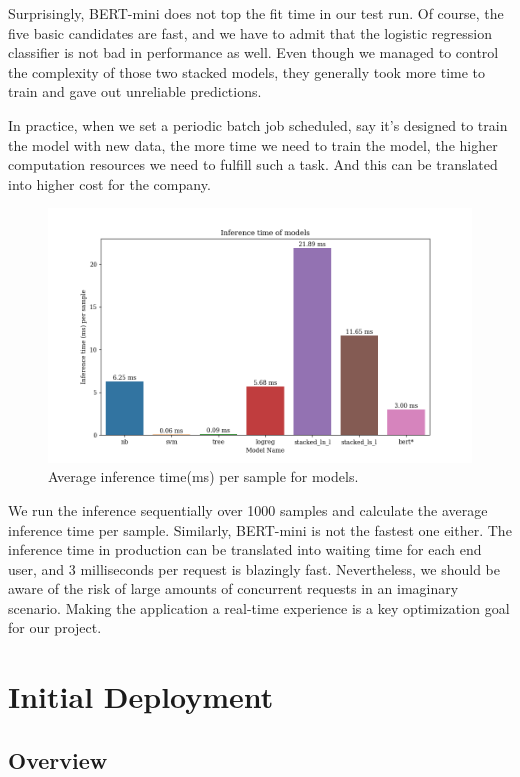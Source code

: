 \documentclass[
	a4paper,
	fontsize=10pt, %
	twoside=false, %
	secnumdepth=2, %
]{kaohandt}
\begin{document}
Surprisingly, BERT-mini does not top the fit time in our test run. Of course, the five basic candidates are fast, and we have to admit that the logistic regression classifier is not bad in performance as well. Even though we managed to control the complexity of those two stacked models, they generally took more time to train and gave out unreliable predictions.

In practice, when we set a periodic batch job scheduled, say it’s designed to train the model with new data, the more time we need to train the model, the higher computation resources we need to fulfill such a task. And this can be translated into higher cost for the company.

\begin{figure}[h]
	\includegraphics[]{inference_time.png}
	\caption{Average inference time(ms) per sample for models.}
	\label{fig:infer_time}
\end{figure}

We run the inference sequentially over 1000 samples and calculate the average inference time per sample. Similarly, BERT-mini is not the fastest one either. The inference time in production can be translated into waiting time for each end user, and 3 milliseconds per request is blazingly fast. Nevertheless, we should be aware of the risk of large amounts of concurrent requests in an imaginary scenario. Making the application a real-time experience is a key optimization goal for our project.

\newpage

\section{Initial Deployment}

\subsection{Overview}
\end{document}
